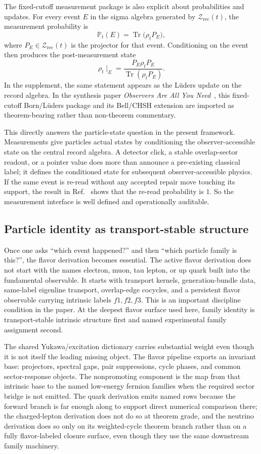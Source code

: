 \documentclass[11pt]{article}
\begin{document}
The fixed-cutoff measurement package is also explicit about probabilities and updates. For every
event \(E\) in the sigma algebra generated by \(\mathcal Z_{\mathrm{rec}}(t)\), the measurement
probability is
\[
\mathbb P_t(E)=\operatorname{Tr}\!\bigl(\rho_t P_E\bigr),
\]
where \(P_E\in\mathcal Z_{\mathrm{rec}}(t)\) is the projector for that event. Conditioning on the
event then produces the post-measurement state
\[
\rho_t\!\mid_E
=
\frac{P_E\rho_t P_E}{\operatorname{Tr}(\rho_t P_E)}.
\]
In the supplement, the same statement appears as the L\"uders update on the record algebra. In
the synthesis paper \emph{Observers Are All You Need}~\cite{ophsynthesis}, this fixed-cutoff
Born/L\"uders package and its Bell/CHSH extension are imported as theorem-bearing rather than
non-theorem commentary.

This directly answers the particle-state question in the present framework. Measurements give particles
actual states by conditioning the observer-accessible state on the central record algebra. A
detector click, a stable overlap-sector readout, or a pointer value does more than announce a
pre-existing classical label; it defines the conditioned state for subsequent observer-accessible
physics. If the same event is re-read without any accepted repair move touching its support, the
result in Ref.~\cite{ophmicrophysics} shows that the re-read probability is \(1\). So the measurement interface is
well defined and operationally auditable.

\subsection{Particle identity as transport-stable structure}

Once one asks ``which event happened?'' and then ``which particle family is this?'', the
flavor derivation becomes essential. The active flavor derivation does not start with the
names electron, muon, tau lepton, or up quark built into the fundamental observable. It starts
with transport kernels, generation-bundle data, same-label eigenline transport, overlap-edge
cocycles, and a persistent flavor observable carrying intrinsic labels \(f1,f2,f3\). This is an
important discipline condition in the paper. At the deepest flavor surface used here, family
identity is transport-stable intrinsic structure first and named experimental family assignment
second.

The shared Yukawa/excitation dictionary carries substantial weight even though it is not
itself the leading missing object. The flavor pipeline exports an invariant base:
projectors, spectral gaps, pair suppressions, cycle phases, and common sector-response objects.
The nonpromoting component is the map from that intrinsic base to the named low-energy fermion
families when the required sector bridge is not emitted. The quark derivation emits named rows because the forward branch is far enough along to
support direct numerical comparison there; the charged-lepton derivation does not do so at theorem
grade, and the neutrino derivation does so only on its weighted-cycle theorem branch rather than
on a fully flavor-labeled closure surface, even though they use the same downstream family machinery.
\end{document}
